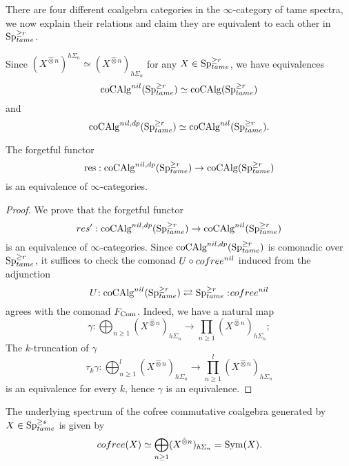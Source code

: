 There are four different coalgebra categories in the $\infty$-category of tame spectra, we now explain their relations and claim they are equivalent to each other in $\operatorname{Sp}^{\geq r}_{tame}$.

Since $(X^{\hat{\otimes}n})^{h\Sigma_n}\simeq (X^{\hat{\otimes}n})_{h\Sigma_n}$ for any $X\in \operatorname{Sp}^{\geq r}_{tame}$, we have equivalences
$$
\operatorname{coCAlg}^{nil}(\operatorname{Sp}^{\geq r}_{tame})
\simeq
\operatorname{coCAlg}(\operatorname{Sp}^{\geq r}_{tame})
$$
and 
$$
\operatorname{coCAlg}^{nil,dp}(\operatorname{Sp}^{\geq r}_{tame})
\simeq
\operatorname{coCAlg}^{nil}(\operatorname{Sp}^{\geq r}_{tame}).
$$


\begin{proposition}
	The forgetful functor
	\[
\operatorname{res}: 
\operatorname{coCAlg}^{nil,dp}(\operatorname{Sp}^{\geq r}_{tame}) \to
\operatorname{coCAlg}(\operatorname{Sp}^{\geq r}_{tame})
\]
 is an equivalence of $\infty$-categories.
\end{proposition}
\begin{proof}
	We prove that the forgetful functor
	\[
	res': \operatorname{coCAlg}^{nil,dp}(\operatorname{Sp}^{\geq r}_{tame})
	\to 
	\operatorname{coCAlg}^{nil}(\operatorname{Sp}^{\geq r}_{tame})
	\]
	is an equivalence of $\infty$-categories.
	Since $\operatorname{coCAlg}^{nil,dp}(\operatorname{Sp}^{\geq r}_{tame})$ is comonadic over $\operatorname{Sp}^{\geq r}_{tame}$, it suffices to check the comonad $U\circ cofree^{nil}$ induced from the adjunction
	$$
	U\negmedspace: \operatorname{coCAlg}^{nil}(\operatorname{Sp}^{\geq r}_{tame})\rightleftarrows \operatorname{Sp}^{\geq r}_{tame}:\negmedspace cofree^{nil}
	$$
	agrees with the comonad $F_{\operatorname{Com}}$. Indeed, we have a natural map
	$$
	\gamma: \bigoplus_{n\geq 1} (X^{\hat{\otimes}n})_{h\Sigma_n}
	\to 
	\prod_{n\geq 1} (X^{\hat{\otimes}n})_{h\Sigma_n};
	$$
	The $k$-truncation of $\gamma$
	$$
	\tau_k \gamma: \bigoplus_{n\geq 1}^l (X^{\hat{\otimes}n})_{h\Sigma_n}
	\to 
	\prod_{n\geq 1}^l (X^{\hat{\otimes}n})_{h\Sigma_n}
	$$
	 is an equivalence for every $k$, hence $\gamma$ is an equivalence.
	\end{proof}
	
\begin{corollary}
	The underlying spectrum of the cofree commutative coalgebra generated by $X\in \operatorname{Sp}^{\geq s}_{tame}$ is given by
	 $$
	 cofree(X) \simeq \bigoplus_{n\geq 1} (X^{\hat{\otimes}n})_{h\Sigma_n}= \operatorname{Sym}(X) .
	 $$
\end{corollary}

